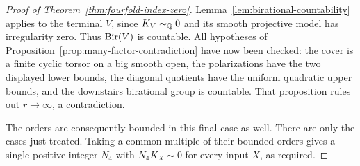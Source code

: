 \begin{proof}[Proof of Theorem~\ref{thm:fourfold-index-zero}]
Lemma~\ref{lem:birational-countability} applies to the terminal
\(V\), since \(K_V\sim_{\mathbb Q}0\) and its smooth projective model has
irregularity zero.  Thus \(\operatorname{Bir}(V)\) is countable.  All hypotheses of
Proposition~\ref{prop:many-factor-contradiction} have now been checked:
the cover is a finite cyclic torsor on a big smooth open, the
polarizations have the two displayed lower bounds, the diagonal
quotients have the uniform quadratic upper bounds, and the
downstairs birational group is countable.  That proposition rules
out \(r\to\infty\), a contradiction.

The orders are consequently bounded in this final case as well.
There are only the cases just treated.  Taking a common multiple of
their bounded orders gives a single positive integer \(N_4\) with
\(N_4K_X\sim0\) for every input \(X\), as required.
\end{proof}
